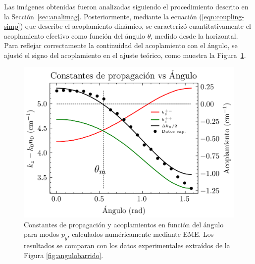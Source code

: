 Las imágenes obtenidas fueron analizadas siguiendo el procedimiento descrito en la Sección~\ref{sec:analimag}. Posteriormente, mediante la ecuación (\ref{eqn:coupling-simp}) que describe el acoplamiento dinámico, se caracterizó cuantitativamente el acoplamiento efectivo como función del ángulo $\theta$, medido desde la horizontal. Para reflejar correctamente la continuidad del acoplamiento con el ángulo, se ajustó el signo del acoplamiento en el ajuste teórico, como muestra la Figura~\ref{fig:invisibility-coup}.
\begin{figure}[H]
    \centering
    \includegraphics[width=0.6\linewidth]{codigo/eigenvalues_vs_angle.png}
    \caption[Constantes de propagación y acoplamientos angulares para modos P]{Constantes de propagación y acoplamientos en función del ángulo para modos $p_y$, calculados numéricamente mediante EME. Los resultados se comparan con los datos experimentales extraídos de la Figura \ref{fig:angulobarrido}. \label{fig:invisibility-coup}}
\end{figure} \vspace{-2ex}
